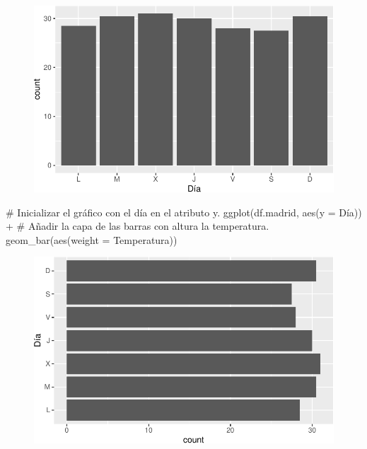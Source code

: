 \documentclass[
  a4paper,
]{scrreport}
\newenvironment{Shaded}{\begin{snugshade}}{\end{snugshade}}
\newcommand{\AttributeTok}[1]{\textcolor[rgb]{0.40,0.45,0.13}{#1}}
\newcommand{\CommentTok}[1]{\textcolor[rgb]{0.37,0.37,0.37}{#1}}
\newcommand{\FunctionTok}[1]{\textcolor[rgb]{0.28,0.35,0.67}{#1}}
\newcommand{\NormalTok}[1]{\textcolor[rgb]{0.00,0.23,0.31}{#1}}
\newcommand{\SpecialCharTok}[1]{\textcolor[rgb]{0.37,0.37,0.37}{#1}}
\theoremstyle{definition}
\theoremstyle{definition}
\theoremstyle{remark}
\begin{document}
\begin{figure}[H]

{\centering \includegraphics{07-graficos_files/figure-pdf/unnamed-chunk-9-1.pdf}

}

\end{figure}

\begin{Shaded}
\begin{Highlighting}[]
\CommentTok{\# Inicializar el gráfico con el día en el atributo y.}
\FunctionTok{ggplot}\NormalTok{(df.madrid, }\FunctionTok{aes}\NormalTok{(}\AttributeTok{y =}\NormalTok{ Día)) }\SpecialCharTok{+}
\CommentTok{\# Añadir la capa de las barras con altura la temperatura.}
    \FunctionTok{geom\_bar}\NormalTok{(}\FunctionTok{aes}\NormalTok{(}\AttributeTok{weight =}\NormalTok{ Temperatura))}
\end{Highlighting}
\end{Shaded}

\begin{figure}[H]

{\centering \includegraphics{07-graficos_files/figure-pdf/unnamed-chunk-10-1.pdf}

}

\end{figure}
\end{document}
